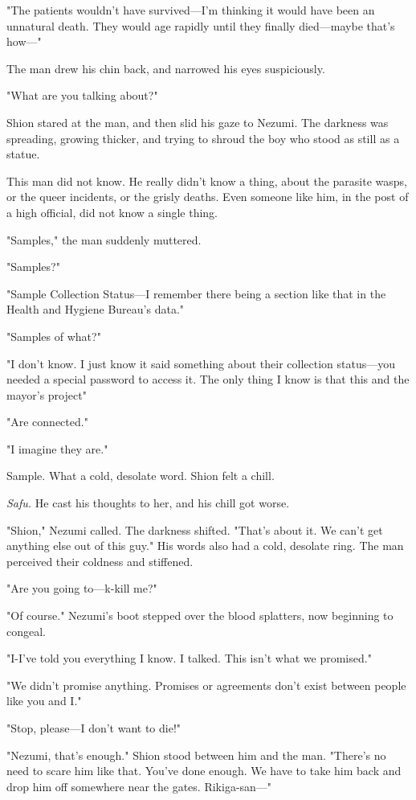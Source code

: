 "The patients wouldn't have survived---I'm thinking it would have been an
unnatural death. They would age rapidly until they finally died---maybe
that's how---"

The man drew his chin back, and narrowed his eyes suspiciously.

"What are you talking about?"

Shion stared at the man, and then slid his gaze to Nezumi. The darkness
was spreading, growing thicker, and trying to shroud the boy who stood
as still as a statue.

This man did not know. He really didn't know a thing, about the parasite
wasps, or the queer incidents, or the grisly deaths. Even someone like
him, in the post of a high official, did not know a single thing.

"Samples," the man suddenly muttered.

"Samples?"

"Sample Collection Status---I remember there being a section like that in
the Health and Hygiene Bureau's data."

"Samples of what?"

"I don't know. I just know it said something about their collection
status---you needed a special password to access it. The only thing I know
is that this and the mayor's project\el "

"Are connected."

"I imagine they are."

Sample. What a cold, desolate word. Shion felt a chill.

\emph{Safu.} He cast his thoughts to her, and his chill got worse.

"Shion," Nezumi called. The darkness shifted. "That's about it. We can't
get anything else out of this guy." His words also had a cold, desolate
ring. The man perceived their coldness and stiffened.

"Are you going to---k-kill me?"

"Of course." Nezumi's boot stepped over the blood splatters, now
beginning to congeal.

"I-I've told you everything I know. I talked. This isn't what we
promised."

"We didn't promise anything. Promises or agreements don't exist between
people like you and I."

"Stop, please---I don't want to die!"

"Nezumi, that's enough." Shion stood between him and the man. "There's
no need to scare him like that. You've done enough. We have to take him
back and drop him off somewhere near the gates. Rikiga-san---"

